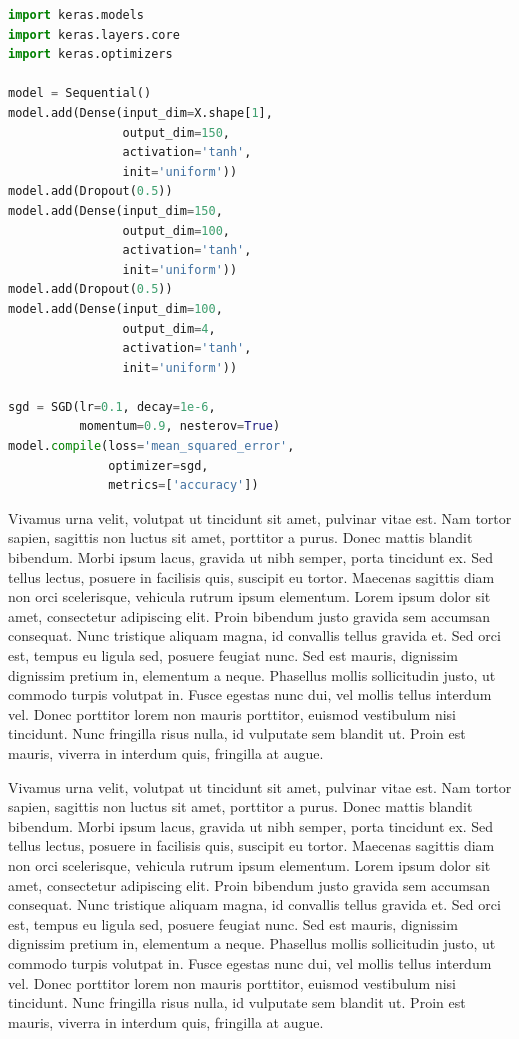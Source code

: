 \documentclass[a4paper, 10 pt, conference]{IEEEtran}
\begin{document}
\begin{lstlisting}[language=python,caption={MLP},label={lst:ri-mlp}]
import keras.models 
import keras.layers.core 
import keras.optimizers

model = Sequential()
model.add(Dense(input_dim=X.shape[1], 
                output_dim=150, 
                activation='tanh', 
                init='uniform'))
model.add(Dropout(0.5))
model.add(Dense(input_dim=150, 
                output_dim=100, 
                activation='tanh', 
                init='uniform'))
model.add(Dropout(0.5))
model.add(Dense(input_dim=100, 
                output_dim=4, 
                activation='tanh', 
                init='uniform'))

sgd = SGD(lr=0.1, decay=1e-6, 
          momentum=0.9, nesterov=True)
model.compile(loss='mean_squared_error', 
              optimizer=sgd, 
              metrics=['accuracy'])
\end{lstlisting}

Vivamus urna velit, volutpat ut tincidunt sit amet, pulvinar vitae est. Nam tortor sapien, sagittis non luctus sit amet, porttitor a purus. Donec mattis blandit bibendum. Morbi ipsum lacus, gravida ut nibh semper, porta tincidunt ex. Sed tellus lectus, posuere in facilisis quis, suscipit eu tortor. Maecenas sagittis diam non orci scelerisque, vehicula rutrum ipsum elementum. Lorem ipsum dolor sit amet, consectetur adipiscing elit. Proin bibendum justo gravida sem accumsan consequat. Nunc tristique aliquam magna, id convallis tellus gravida et. Sed orci est, tempus eu ligula sed, posuere feugiat nunc. Sed est mauris, dignissim dignissim pretium in, elementum a neque. Phasellus mollis sollicitudin justo, ut commodo turpis volutpat in. Fusce egestas nunc dui, vel mollis tellus interdum vel. Donec porttitor lorem non mauris porttitor, euismod vestibulum nisi tincidunt. Nunc fringilla risus nulla, id vulputate sem blandit ut. Proin est mauris, viverra in interdum quis, fringilla at augue.

Vivamus urna velit, volutpat ut tincidunt sit amet, pulvinar vitae est. Nam tortor sapien, sagittis non luctus sit amet, porttitor a purus. Donec mattis blandit bibendum. Morbi ipsum lacus, gravida ut nibh semper, porta tincidunt ex. Sed tellus lectus, posuere in facilisis quis, suscipit eu tortor. Maecenas sagittis diam non orci scelerisque, vehicula rutrum ipsum elementum. Lorem ipsum dolor sit amet, consectetur adipiscing elit. Proin bibendum justo gravida sem accumsan consequat. Nunc tristique aliquam magna, id convallis tellus gravida et. Sed orci est, tempus eu ligula sed, posuere feugiat nunc. Sed est mauris, dignissim dignissim pretium in, elementum a neque. Phasellus mollis sollicitudin justo, ut commodo turpis volutpat in. Fusce egestas nunc dui, vel mollis tellus interdum vel. Donec porttitor lorem non mauris porttitor, euismod vestibulum nisi tincidunt. Nunc fringilla risus nulla, id vulputate sem blandit ut. Proin est mauris, viverra in interdum quis, fringilla at augue.
\end{document}

